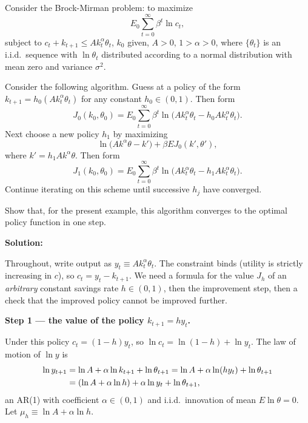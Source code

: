 \documentclass[12pt, letterpaper]{article}
\begin{document}
\begin{tcolorbox}[oddbox,title={Exercise 3.1 \quad Howard's policy iteration algorithm}]
\begin{tcolorbox}[questionbox]
Consider the Brock-Mirman problem: to maximize
\[
E_0\sum_{t=0}^\infty\beta^t\ln c_t,
\]
subject to $c_t+k_{t+1}\le Ak_t^\alpha\theta_t$, $k_0$ given, $A>0$, $1>\alpha>0$, where
$\{\theta_t\}$ is an i.i.d.\ sequence with $\ln\theta_t$ distributed according to a normal
distribution with mean zero and variance $\sigma^2$.

Consider the following algorithm. Guess at a policy of the form $k_{t+1}=h_0(Ak_t^\alpha\theta_t)$
for any constant $h_0\in(0,1)$. Then form
\[
J_0(k_0,\theta_0)=E_0\sum_{t=0}^\infty\beta^t\ln\big(Ak_t^\alpha\theta_t-h_0Ak_t^\alpha\theta_t\big).
\]
Next choose a new policy $h_1$ by maximizing
\[
\ln\big(Ak^\alpha\theta-k'\big)+\beta EJ_0(k',\theta'),
\]
where $k'=h_1Ak^\alpha\theta$. Then form
\[
J_1(k_0,\theta_0)=E_0\sum_{t=0}^\infty\beta^t\ln\big(Ak_t^\alpha\theta_t-h_1Ak_t^\alpha\theta_t\big).
\]
Continue iterating on this scheme until successive $h_j$ have converged.

Show that, for the present example, this algorithm converges to the optimal policy function in
one step.
\end{tcolorbox}

\textbf{Solution:}

Throughout, write output as $y_t\equiv Ak_t^\alpha\theta_t$. The constraint binds (utility is
strictly increasing in $c$), so $c_t=y_t-k_{t+1}$. We need a formula for the value
$J_h$ of an \emph{arbitrary} constant savings rate $h\in(0,1)$, then the improvement step,
then a check that the improved policy cannot be improved further.

\medskip
\textbf{Step 1 --- the value of the policy $k_{t+1}=hy_t$.}

Under this policy $c_t=(1-h)y_t$, so $\ln c_t=\ln(1-h)+\ln y_t$. The law of motion of
$\ln y$ is
\begin{align}
\ln y_{t+1}&=\ln A+\alpha\ln k_{t+1}+\ln\theta_{t+1}
=\ln A+\alpha\ln(hy_t)+\ln\theta_{t+1}\notag\\
&=(\ln A+\alpha\ln h)+\alpha\ln y_t+\ln\theta_{t+1}, \label{eq:lny}
\end{align}
an AR(1) with coefficient $\alpha\in(0,1)$ and i.i.d.\ innovation of mean $E\ln\theta=0$.
Let $\mu_h\equiv\ln A+\alpha\ln h$.


\end{tcolorbox}
\end{document}
